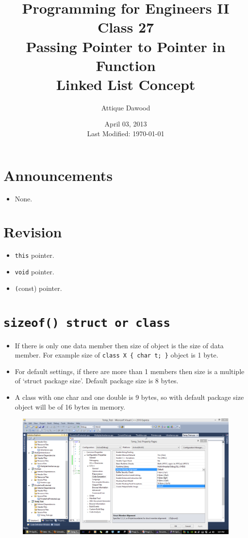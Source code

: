\documentclass[12pt,a4paper]{article}
\title{\vspace{-2cm}Programming for Engineers II\\Class 27\\Passing Pointer to Pointer in Function\\Linked List Concept}
\author{Attique Dawood}
\date{April 03, 2013\\[0.2cm] Last Modified: \today}
\begin{document}
\maketitle
\section{Announcements}
\begin{itemize}
\item None.
\end{itemize}
\section{Revision}
\begin{itemize}
\item \texttt{this} pointer.
\item \texttt{void} pointer.
\item \texttt(const) pointer.
\end{itemize}
\section{\texttt{sizeof() struct or class}}
\begin{itemize}
\item If there is only one data member then size of object is the size of data member. For example size of \verb|class X { char t; }| object is 1 byte.
\item For default settings, if there are more than 1 members then size is a multiple of `struct package size'. Default package size is 8 bytes.
\item A class with one char and one double is 9 bytes, so with default package size object will be of 16 bytes in memory.
\end{itemize}
\begin{figure}[H]
\includegraphics[width=\textwidth]{StructPackagingSize}
\end{figure}
\end{document}
